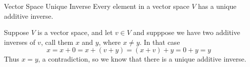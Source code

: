 \documentclass{standalone}
\begin{document}
\begin{theo*}{Vector Space Unique Inverse}
  Every element in a vector space $ V$ has a unique additive inverse.
  \begin{pf}
    Suppose $ V$ is a vector space, and let $  v \in V$ and supppose we have two additive inverses of $ v$, call them $ x$ and $ y$, where $ x \neq  y$. In that case
    \[
      x =  x  +  0 = x  +  \left( v  +  y \right) = \left( x  +  v \right)  +  y =  0  +  y =  y
    \]
    Thus $ x =  y$, a contradiction, so we know that there is a unique additive inverse.
  \end{pf}
\end{theo*}
\end{document}
